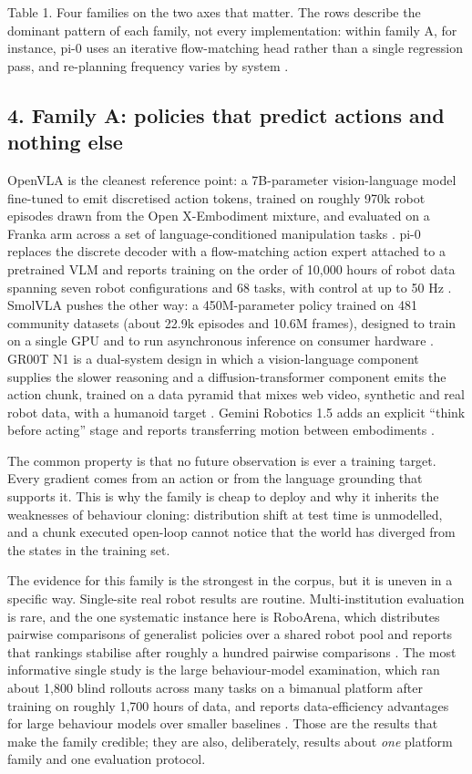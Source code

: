 \documentclass[
  10pt,
  english,
]{article}
\begin{document}
Table 1. Four families on the two axes that matter. The rows describe
the dominant pattern of each family, not every implementation: within
family A, for instance, pi-0 uses an iterative flow-matching head rather
than a single regression pass, and re-planning frequency varies by
system \citep{pi0}.

\hypertarget{family-a-policies-that-predict-actions-and-nothing-else}{%
\subsection{4. Family A: policies that predict actions and nothing
else}\label{family-a-policies-that-predict-actions-and-nothing-else}}

OpenVLA is the cleanest reference point: a 7B-parameter vision-language
model fine-tuned to emit discretised action tokens, trained on roughly
970k robot episodes drawn from the Open X-Embodiment mixture, and
evaluated on a Franka arm across a set of language-conditioned
manipulation tasks \citep{openvla}. pi-0 replaces the discrete decoder
with a flow-matching action expert attached to a pretrained VLM and
reports training on the order of 10,000 hours of robot data spanning
seven robot configurations and 68 tasks, with control at up to 50 Hz
\citep{pi0}. SmolVLA pushes the other way: a 450M-parameter policy
trained on 481 community datasets (about 22.9k episodes and 10.6M
frames), designed to train on a single GPU and to run asynchronous
inference on consumer hardware \citep{smolvla}. GR00T N1 is a
dual-system design in which a vision-language component supplies the
slower reasoning and a diffusion-transformer component emits the action
chunk, trained on a data pyramid that mixes web video, synthetic and
real robot data, with a humanoid target \citep{groot_n1}. Gemini
Robotics 1.5 adds an explicit ``think before acting'' stage and reports
transferring motion between embodiments \citep{gemini_robotics15}.

The common property is that no future observation is ever a training
target. Every gradient comes from an action or from the language
grounding that supports it. This is why the family is cheap to deploy
and why it inherits the weaknesses of behaviour cloning: distribution
shift at test time is unmodelled, and a chunk executed open-loop cannot
notice that the world has diverged from the states in the training set.

The evidence for this family is the strongest in the corpus, but it is
uneven in a specific way. Single-site real robot results are routine.
Multi-institution evaluation is rare, and the one systematic instance
here is RoboArena, which distributes pairwise comparisons of generalist
policies over a shared robot pool and reports that rankings stabilise
after roughly a hundred pairwise comparisons \citep{roboarena}. The most
informative single study is the large behaviour-model examination, which
ran about 1,800 blind rollouts across many tasks on a bimanual platform
after training on roughly 1,700 hours of data, and reports
data-efficiency advantages for large behaviour models over smaller
baselines \citep{lbm}. Those are the results that make the family
credible; they are also, deliberately, results about \emph{one} platform
family and one evaluation protocol.
\end{document}
